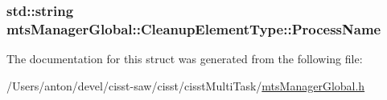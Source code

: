 \subsubsection[{Process\+Name}]{\setlength{\rightskip}{0pt plus 5cm}std\+::string mts\+Manager\+Global\+::\+Cleanup\+Element\+Type\+::\+Process\+Name}\label{structmts_manager_global_1_1_cleanup_element_type_a0cf55ba12a11d5de8a7f703e5358caca}


The documentation for this struct was generated from the following file\+:\begin{DoxyCompactItemize}
\item 
/\+Users/anton/devel/cisst-\/saw/cisst/cisst\+Multi\+Task/\hyperlink{mts_manager_global_8h}{mts\+Manager\+Global.\+h}\end{DoxyCompactItemize}
